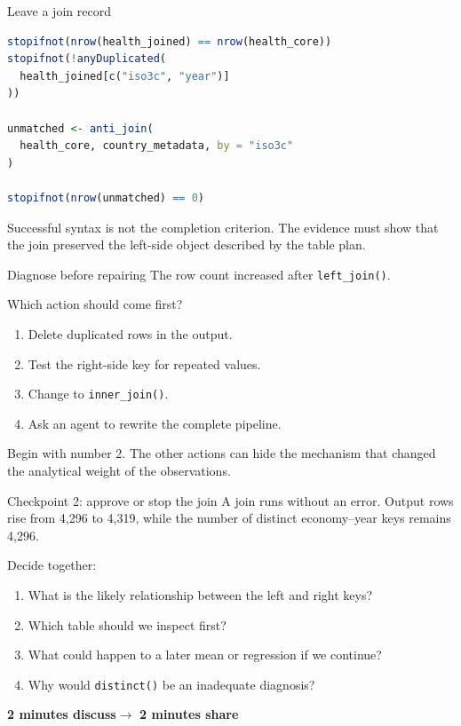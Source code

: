 \begin{frame}[fragile]{Leave a join record}
\begin{lstlisting}[language=R]
stopifnot(nrow(health_joined) == nrow(health_core))
stopifnot(!anyDuplicated(
  health_joined[c("iso3c", "year")]
))

unmatched <- anti_join(
  health_core, country_metadata, by = "iso3c"
)

stopifnot(nrow(unmatched) == 0)
\end{lstlisting}

  Successful syntax is not the completion criterion. The evidence must show
  that the join preserved the left-side object described by the table plan.
\end{frame}

\begin{frame}{Diagnose before repairing}
  The row count increased after \texttt{left\_join()}.

  Which action should come first?
  \begin{enumerate}
    \item Delete duplicated rows in the output.
    \item Test the right-side key for repeated values.
    \item Change to \texttt{inner\_join()}.
    \item Ask an agent to rewrite the complete pipeline.
  \end{enumerate}

  \vfill
  Begin with number 2. The other actions can hide the mechanism that changed the
  analytical weight of the observations.
\end{frame}

\begin{frame}{Checkpoint 2: approve or stop the join}
  A join runs without an error. Output rows rise from 4,296 to 4,319, while the
  number of distinct economy--year keys remains 4,296.

  \vspace{0.5em}
  Decide together:
  \begin{enumerate}
    \item What is the likely relationship between the left and right keys?
    \item Which table should we inspect first?
    \item What could happen to a later mean or regression if we continue?
    \item Why would \texttt{distinct()} be an inadequate diagnosis?
  \end{enumerate}

  \vfill
  \centering
  \textbf{2 minutes discuss}\qquad$\longrightarrow$\qquad
  \textbf{2 minutes share}
\end{frame}
